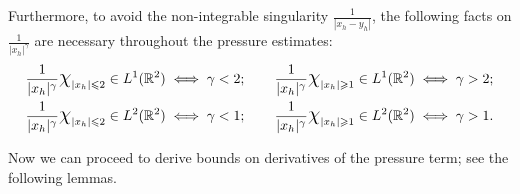 \documentclass[10pt,reqno]{amsart}
\numberwithin{equation}{section}
\begin{document}
Furthermore, to avoid the non-integrable singularity $\frac{1}{|x_h-y_h|}$,
the following facts on $\frac{1}{|x_h|^\gamma}$ are necessary throughout the pressure estimates:
\begin{equation}\label{observe integration}\begin{split}
		&\frac{1}{|x_h|^\gamma}\text{\Large$\text{\Large$\chi$}$}_{|x_h|\leqslant 2}\in L^1(\mathbb{R}^2)\iff \gamma<2;\ \ \ \ \ \
		\frac{1}{|x_h|^\gamma}\text{\Large$\text{\Large$\chi$}$}_{|x_h|\geqslant 1}\in L^1(\mathbb{R}^2)\iff \gamma>2;\\
		&\frac{1}{|x_h|^\gamma}\text{\Large$\text{\Large$\chi$}$}_{|x_h|\leqslant 2}\in L^2(\mathbb{R}^2)\iff \gamma<1;\ \ \ \ \ \ 
		\frac{1}{|x_h|^\gamma}\text{\Large$\text{\Large$\chi$}$}_{|x_h|\geqslant 1}\in L^2(\mathbb{R}^2)\iff \gamma>1.
	\end{split}
\end{equation}
 


Now we can proceed  
to derive bounds on derivatives of the pressure term; see the following lemmas.  
\end{document}
